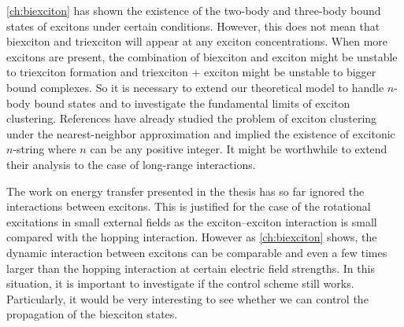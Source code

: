 



\autoref{ch:biexciton} has shown the existence of  the two-body and three-body bound states of excitons under certain 
conditions. However, this does not mean that biexciton and triexciton will appear at any exciton concentrations. 
When more excitons are present, the combination of biexciton and exciton might be unstable to triexciton formation
 and triexciton $+$ exciton might be unstable to bigger bound complexes.  So it is necessary to extend our theoretical
model to handle $n$-body bound states and to investigate the fundamental limits of exciton clustering. References 
\cite{Ezaki1994, orchinnikov1967, pleutin2000} have already studied the problem of exciton clustering under the 
nearest-neighbor approximation and implied the existence of  excitonic $n$-string where $n$ can be any 
positive integer.  It might be 
worthwhile to extend their analysis to the case of long-range interactions. 


The work on energy transfer presented in the thesis has so far ignored the interactions between excitons. This is justified for the case of the rotational 
excitations in small external fields as the exciton--exciton interaction is small compared with the hopping interaction. 
However as \autoref{ch:biexciton} shows, the dynamic interaction between excitons can be comparable and even a few 
times larger than the hopping interaction at certain electric field strengths. In this situation, it is important to investigate
 if the control scheme still works. Particularly, it would be very interesting to see whether we can control the propagation
 of the biexciton states. 
 
